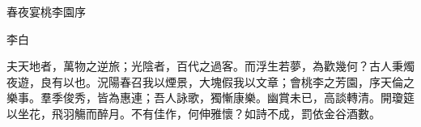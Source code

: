 春夜宴桃李園序

李白

夫天地者，萬物之逆旅；光陰者，百代之過客。而浮生若夢，為歡幾何？古人秉燭夜遊，良有以也。況陽春召我以煙景，大塊假我以文章；會桃李之芳園，序天倫之樂事。羣季俊秀，皆為惠連；吾人詠歌，獨慚康樂。幽賞未已，高談轉清。開瓊筵以坐花，飛羽觴而醉月。不有佳作，何伸雅懷？如詩不成，罰依金谷酒數。
